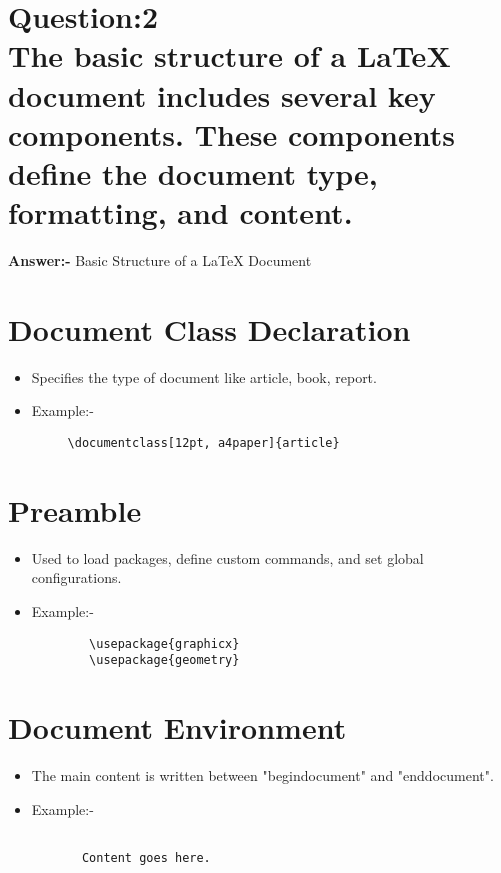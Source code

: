 \newpage
\section*{Question:2 \\ The basic structure of a LaTeX document includes several key components. These components define the document type, formatting, and content.}
\textbf{Answer:-} Basic Structure of a LaTeX Document

\section{Document Class Declaration}
\begin{itemize}
    \item Specifies the type of document like article, book, report.
    \item Example:-
     \begin{verbatim}
     \documentclass[12pt, a4paper]{article}
     \end{verbatim}
     
\end{itemize}


\section{Preamble}
\begin{itemize}
    \item Used to load packages, define custom commands, and set global configurations.
    \item Example:-
    \begin{verbatim}
        \usepackage{graphicx}
        \usepackage{geometry}
    \end{verbatim}

\end{itemize}

\section{Document Environment}
\begin{itemize}
    \item The main content is written between "begin{document}" and "end{document}".

    \item Example:-
    \begin{verbatim}
        
       Content goes here. 
       

    \end{verbatim}

\end{itemize}

